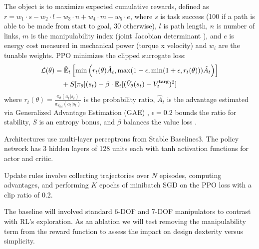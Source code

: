 \documentclass[conference]{IEEEtran}
\begin{document}
The object is to maximize expected cumulative rewards, defined as $r = w_1 \cdot s - w_2 \cdot l - w_3 \cdot n + w_4 \cdot m - w_5 \cdot e$, where $s$ is task success (100 if a path is able to be made from start to goal, 30 otherwise), $l$ is path length, $n$ is number of links, $m$ is the manipulability index (joint Jacobian determinant \cite{yoshikawa1985manipulability}), and $e$ is energy cost measured in mechanical power (torque x velocity) and $w_i$ are the tunable weights.
PPO minimizes the clipped surrogate loss:
\begin{align}
\mathcal{L}(\theta) &= \hat{\mathbb{E}}_t \left[ \min\left(r_t(\theta) \hat{A}_t, \max(1-\epsilon, \min(1+\epsilon, r_t(\theta))) \hat{A}_t\right) \right] \notag \\
&\quad + S[\pi_\theta](s_t) - \beta \cdot \mathbb{E}_t [(\hat{V}_\theta(s_t) - V_t^{\text{targ}})^2]
\end{align}
where $r_t(\theta) = \frac{\pi_\theta(a_t|s_t)}{\pi_{\theta_{\text{old}}}(a_t|s_t)}$ is the probability ratio, $\hat{A}_t$ is the advantage estimated via Generalized Advantage Estimation (GAE) \cite{schulman2015high}, $\epsilon=0.2$ bounds the ratio for stability, $S$ is an entropy bonus, and $\beta$ balances the value loss \cite{schulman2017proximal}.

Architectures use multi-layer perceptrons from Stable Baselines3.
The policy network has 3 hidden layers of 128 units each with tanh activation functions for actor and critic.

Update rules involve collecting trajectories over $N$ episodes, computing advantages, and performing $K$ epochs of minibatch SGD on the PPO loss with a clip ratio of 0.2.

The baseline will involved standard 6-DOF and 7-DOF manipulators to contrast with RL's exploration.
As an ablation we will test removing the manipulability term from the reward function to assess the impact on design dexterity versus simplicity.
\end{document}
